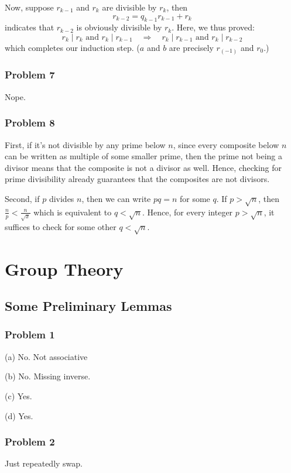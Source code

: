 \documentclass{book}
\begin{document}
Now, suppose $r_{k - 1}$ and $r_k$ are divisible by $r_k$, then
$$r_{k - 2} = q_{k - 1} r_{k - 1} + r_k$$
indicates that $r_{k - 2}$ is obviously divisible by $r_k$. Here, we thus proved:
$$r_k \mid r_k \text{ and } r_k \mid r_{k - 1} \quad \Rightarrow \quad r_k \mid r_{k - 1} \text{ and } r_k \mid r_{k - 2}$$
which completes our induction step. ($a$ and $b$ are precisely $r_{(-1)}$ and $r_0$.)

\subsection*{Problem 7}
Nope.

\subsection*{Problem 8}
First, if it's not divisible by any prime below $n$, since every composite below $n$ can be written as multiple of some smaller prime, then the prime not being a divisor means that the composite is not a divisor as well. Hence, checking for prime divisibility already guarantees that the composites are not divisors.

Second, if $p$ divides $n$, then we can write $pq = n$ for some $q$. If $p > \sqrt{n}$, then $\frac{n}{p} < \frac{n}{\sqrt{x}}$ which is equivalent to $q < \sqrt{n}$. Hence, for every integer $p > \sqrt{n}$, it suffices to check for some other $q < \sqrt{n}$.

\chapter{Group Theory}

\section{Some Preliminary Lemmas}

\subsection*{Problem 1}
(a)
No. Not associative

\noindent
(b)
No. Missing inverse.

\noindent
(c)
Yes.

\noindent
(d)
Yes.

\subsection*{Problem 2}
Just repeatedly swap.
\end{document}
